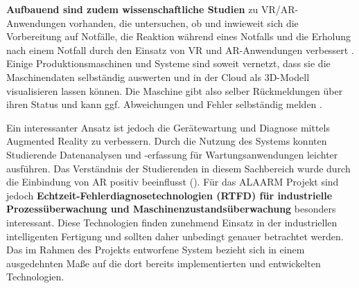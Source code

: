 \textbf{Aufbauend sind zudem wissenschaftliche Studien} zu VR/AR-Anwendungen vorhanden, die untersuchen, ob und inwieweit sich die Vorbereitung auf Notfälle, die Reaktion während eines Notfalls und die Erholung nach einem Notfall durch den Einsatz von VR und AR-Anwendungen verbessert \autocite{VRandAR}. Einige Produktionsmaschinen und Systeme sind soweit vernetzt, dass sie die Maschinendaten selbständig auswerten und in der Cloud als 3D-Modell visualisieren lassen können. Die Maschine gibt also selber Rückmeldungen über ihren Status und kann ggf. Abweichungen und Fehler selbständig melden \autocite{Mascienenausf_entdecken}.

Ein interessanter Ansatz ist jedoch die Gerätewartung und Diagnose mittels Augmented Reality zu verbessern. Durch die Nutzung des Systems konnten Studierende Datenanalysen und -erfassung für Wartungsanwendungen leichter ausführen. Das Verständnis der Studierenden in diesem Sachbereich wurde durch die Einbindung von AR positiv beeinflusst (\cite{Develop_and_Asses_AR}). Für das ALAARM Projekt sind jedoch \textbf{Echtzeit-Fehlerdiagnosetechnologien (RTFD) für industrielle Prozessüberwachung und Maschinenzustandsüberwachung} besonders interessant. Diese Technologien finden zunehmend Einsatz in der industriellen intelligenten Fertigung und sollten daher unbedingt genauer betrachtet werden. Das im Rahmen des Projekts entworfene System bezieht sich in einem ausgedehnten Maße auf die dort bereits implementierten und entwickelten Technologien.

\newpage




\newpage




